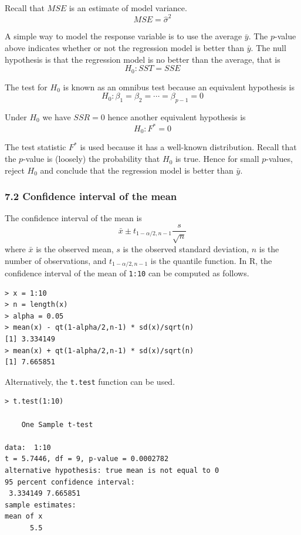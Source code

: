 \documentclass[12pt]{article}
\begin{document}
Recall that $MSE$ is an estimate of model variance.
\[
MSE=\hat\sigma^2
\]

A simple way to model the response variable is to use the average $\bar y$.
The $p$-value above indicates whether or not the regression model
is better than $\bar y$.
The null hypothesis is that the regression model is no better
than the average, that is
\[
H_0:SST=SSE
\]

The test for $H_0$ is known as an omnibus test because an
equivalent hypothesis is
\[
H_0:\beta_1=\beta_2=\cdots=\beta_{p-1}=0
\]

Under $H_0$ we have $SSR=0$ hence another
equivalent hypothesis is
\[
H_0:F^*=0
\]

The test statistic $F^*$ is used
because it has a well-known distribution.
Recall that the $p$-value is (loosely) the probability
that $H_0$ is true.
Hence for small $p$-values, reject $H_0$ and
conclude that the regression model is better than $\bar y$.

\subsubsection*{7.2 Confidence interval of the mean}
The confidence interval of the mean is
\[
\bar x\pm t_{1-\alpha/2, n-1}\frac{s}{\sqrt n}
\]
where $\bar x$ is the observed mean,
$s$ is the observed standard deviation,
$n$ is the number of observations,
and $t_{1-\alpha/2, n-1}$ is the quantile function.
In R, the confidence interval of the mean of \verb$1:10$
can be computed as follows.

{\footnotesize\begin{verbatim}
> x = 1:10
> n = length(x)
> alpha = 0.05
> mean(x) - qt(1-alpha/2,n-1) * sd(x)/sqrt(n)
[1] 3.334149
> mean(x) + qt(1-alpha/2,n-1) * sd(x)/sqrt(n)
[1] 7.665851
\end{verbatim}}

Alternatively, the \verb$t.test$ function can be used.

{\footnotesize\begin{verbatim}
> t.test(1:10)

	One Sample t-test

data:  1:10
t = 5.7446, df = 9, p-value = 0.0002782
alternative hypothesis: true mean is not equal to 0
95 percent confidence interval:
 3.334149 7.665851
sample estimates:
mean of x 
      5.5 
\end{verbatim}}
\end{document}
